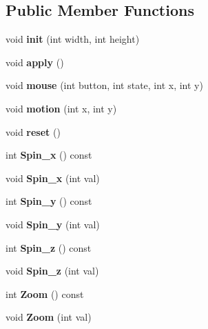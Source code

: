 \subsection*{Public Member Functions}
\begin{DoxyCompactItemize}
\item 
void {\bfseries init} (int width, int height)\label{classsfs__visualizer_1_1CameraControl_a2ebade4f88d9f8e2ef07b598be75165e}

\item 
void {\bfseries apply} ()\label{classsfs__visualizer_1_1CameraControl_a027eb280a548929964972a0269948704}

\item 
void {\bfseries mouse} (int button, int state, int x, int y)\label{classsfs__visualizer_1_1CameraControl_a763502cfb980553abf5ec46aa1c8547a}

\item 
void {\bfseries motion} (int x, int y)\label{classsfs__visualizer_1_1CameraControl_a91c42f259015cd609ed1c798648d2dc4}

\item 
void {\bfseries reset} ()\label{classsfs__visualizer_1_1CameraControl_aa79ef348ac442df65714a8d2a0e7cd12}

\item 
int {\bfseries Spin\-\_\-x} () const \label{classsfs__visualizer_1_1CameraControl_a2fafda6e38bdac37bbc46c4f1333040f}

\item 
void {\bfseries Spin\-\_\-x} (int val)\label{classsfs__visualizer_1_1CameraControl_a79adbf4e7dace42051c064968d4639fe}

\item 
int {\bfseries Spin\-\_\-y} () const \label{classsfs__visualizer_1_1CameraControl_a4da6283e846774916d071df453993eb0}

\item 
void {\bfseries Spin\-\_\-y} (int val)\label{classsfs__visualizer_1_1CameraControl_a0ded6da7a27228e8a4000d78508dc825}

\item 
int {\bfseries Spin\-\_\-z} () const \label{classsfs__visualizer_1_1CameraControl_aa72b99e4780eb1f62a83d6994fa3bdbb}

\item 
void {\bfseries Spin\-\_\-z} (int val)\label{classsfs__visualizer_1_1CameraControl_af98bf1747aa9cbcce19a96b78b7865b5}

\item 
int {\bfseries Zoom} () const \label{classsfs__visualizer_1_1CameraControl_a8b13370da1a6033ec63b46f79a1d056b}

\item 
void {\bfseries Zoom} (int val)\label{classsfs__visualizer_1_1CameraControl_ae09c78422ef19a9e3db08be0e9b13766}

\end{DoxyCompactItemize}
